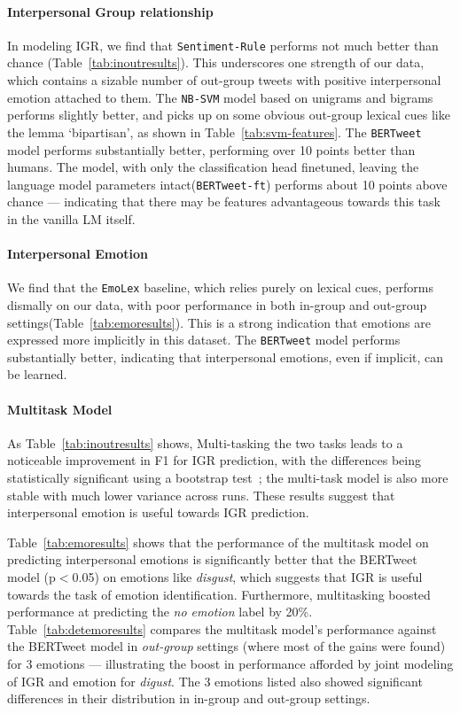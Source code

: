 \paragraph{Interpersonal Group relationship} In modeling IGR, we find that \texttt{Sentiment-Rule} performs not much better than chance (Table~\ref{tab:inoutresults}). This underscores one strength of our data, which contains a sizable number of out-group tweets with positive interpersonal emotion attached to them. The \texttt{NB-SVM} model based on unigrams and bigrams performs slightly better, and picks up on some obvious out-group lexical cues like the lemma `bipartisan', as shown in Table~\ref{tab:svm-features}. The \texttt{BERTweet} model performs substantially better, performing over 10 points better than humans. The model, with only the classification head finetuned, leaving the language model parameters intact(\texttt{BERTweet-ft}) performs about 10 points above chance --- indicating that there may be features advantageous towards this task in the vanilla LM itself.

\paragraph{Interpersonal Emotion}

We find that the \texttt{EmoLex} baseline, which relies purely on lexical cues, performs dismally on our data, with poor performance in both in-group and out-group settings(Table~\ref{tab:emoresults}). This is a strong indication that emotions are expressed more implicitly in this dataset. The \texttt{BERTweet} model performs substantially better, indicating that interpersonal emotions, even if implicit, can be learned.

\paragraph{Multitask Model}

As Table~\ref{tab:inoutresults} shows, Multi-tasking the two tasks leads to a noticeable improvement in F1 for IGR prediction, with the differences being statistically significant using a bootstrap test~\cite[p$<$0.05;][]{berg-kirkpatrick-etal-2012-empirical}; the multi-task model is also more stable with much lower variance across runs. These results suggest that interpersonal emotion is useful towards IGR prediction.

Table~\ref{tab:emoresults} shows that the performance of the multitask model on predicting interpersonal emotions is significantly better that the BERTweet model (p$<$0.05) on emotions like \emph{disgust}, which suggests that IGR is useful towards the task of emotion identification. Furthermore, multitasking boosted performance at predicting the \emph{no emotion} label by 20\%.  Table~\ref{tab:detemoresults} compares the multitask model's performance against the BERTweet model in \emph{out-group} settings (where most of the gains were found) for 3 emotions --- illustrating the boost in performance afforded by joint modeling of IGR and emotion for \emph{digust}. The 3 emotions listed also showed significant differences in their distribution in in-group and out-group settings.

